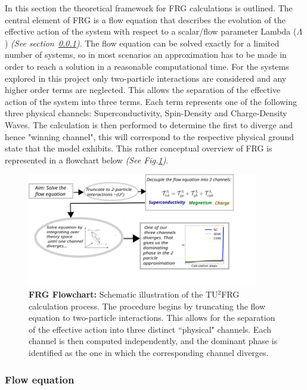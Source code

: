 \documentclass[12pt]{article}
\begin{document}
\medskip

\noindent In this section the theoretical framework for FRG calculations is outlined. The central element of FRG is a flow equation that describes the evolution of the effective action of the system with respect to a scalar/flow parameter Lambda ($\Lambda$) \textit{(See section~\ref{subsubsec:Flow Equation})}.
The flow equation can be solved exactly for a limited number of systems, so in most scenarios an approximation has to be made in order to reach a solution in a reasonable computational time.  
For the systems explored in this project only two-particle
interactions are considered and any higher order terms are neglected.
This allows the separation of the effective action of the system into three terms. Each term represents one of the following three physical channels: Superconductivity, Spin-Density and Charge-Density Waves.
The calculation is then performed to determine the first to diverge and hence "winning channel", this will correspond to the respective physical ground state that the model exhibits. This rather conceptual overview of FRG is represented in a flowchart below \textit{(See Fig.\ref{fig:FRGflowdiagram})}.
 

\begin{figure}[htbp]  %
    \centering
    \includegraphics[width=0.9\textwidth]{FRGflowdiagram.png}  %
    \caption{\textbf{FRG Flowchart:} Schematic illustration of the TU$^2$FRG calculation process.
     The procedure begins by truncating the flow equation to two-particle interactions. 
     This allows for the separation of the effective action into three distinct ``physical" channels. 
     Each channel is then computed independently, and the dominant phase is identified as the 
     one in which the corresponding channel diverges.}
    \label{fig:FRGflowdiagram}
\end{figure}

\subsubsection{Flow equation}
\label{subsubsec:Flow Equation}
\end{document}
